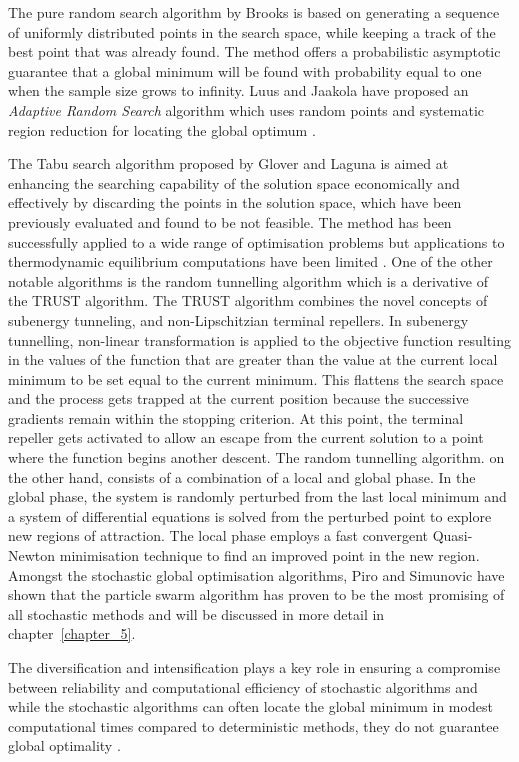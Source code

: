 	The pure random search algorithm by Brooks \cite{Brooks:1958aa} is based on generating a sequence of uniformly distributed points in the search space, while keeping a track of the best point that was already found. The method offers a probabilistic asymptotic guarantee that a global minimum will be found with probability equal to one when the sample size grows to infinity. Luus and Jaakola have proposed an \emph{Adaptive Random Search} algorithm which uses random points and systematic region reduction for locating the global optimum \cite{Luus:1973aa}.

	The Tabu search algorithm proposed by Glover and Laguna \cite{Glover:1993aa} is aimed at enhancing the searching capability of the solution space economically and effectively by discarding the points in the solution space, which have been previously evaluated and found to be not feasible. The method has been successfully applied to a wide range of optimisation problems but  applications to thermodynamic equilibrium computations have been limited \cite{SRINIVAS2007760,Teh03}. One of the other notable algorithms is the random tunnelling algorithm which is a derivative of the TRUST algorithm. The TRUST algorithm \cite{Barhen97} combines the novel concepts of subenergy tunneling, and non-Lipschitzian terminal repellers. In subenergy tunnelling, non-linear transformation is applied to the objective function resulting in the values of the function that are greater than the value at the current local minimum to be set equal to the current minimum. This flattens the search space and the process gets trapped at the current position because the successive gradients remain within the stopping criterion. At this point, the terminal repeller gets activated to allow an escape from the current solution to a point where the function begins another descent. The random tunnelling algorithm. on the other hand, consists of a combination of a local and global phase. In the global phase, the system is randomly perturbed from the last local minimum and a system of differential equations is solved from the perturbed point to explore new regions of attraction. The local phase employs a fast convergent Quasi-Newton minimisation technique to find an improved point in the new region. Amongst the stochastic global optimisation algorithms, Piro and Simunovic \cite{Piro16} have shown that the particle swarm algorithm has proven to be the most promising of all stochastic methods and will be discussed in more detail in chapter~\ref{chapter_5}.

	The diversification and intensification plays a key role in ensuring a compromise between reliability and computational efficiency of stochastic algorithms and while the stochastic algorithms can often locate the global minimum in modest computational times compared to deterministic methods, they do not guarantee global optimality \cite{Zhang11,Blum:2003aa}.

